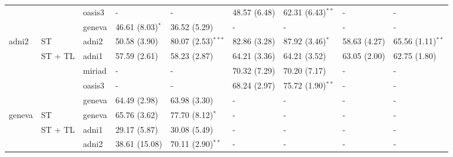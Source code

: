 \begin{table*}
{\begin{tabular}{lllllllll}
       &                 & oasis3         &              -       &             -          &   48.57 (6.48) &   62.31 (6.43)$^{**}$ &             - &             -         \\
       &                 & geneva         &   46.61 (8.03)$^{*}$ &  36.52 (5.29)          &              - &              -        &             - &             -         \\
\toprule
adni2  &         ST      & adni2          &   50.58 (3.90)       &  80.07 (2.53)$^{***}$  &   82.86 (3.28) &   87.92 (3.46)$^{*}$  &  58.63 (4.27) &  65.56 (1.11)$^{**}$  \\
\cmidrule(lr){2-9}
       &         ST + TL & adni1          &   57.59 (2.61)       &  58.23 (2.87)          &   64.21 (3.36) &   64.21 (3.52)        &  63.05 (2.00) &  62.75 (1.80)         \\
       &                 & miriad         &              -       &             -          &   70.32 (7.29) &   70.20 (7.17)        &             - &             -         \\
       &                 & oasis3         &              -       &             -          &   68.24 (2.97) &   75.72 (1.90)$^{**}$ &             - &             -         \\
       &                 & geneva         &   64.49 (2.98)       &  63.98 (3.30)          &              - &              -        &             - &             -         \\
\toprule
geneva &         ST      & geneva         &   65.76 (3.62)       &  77.70 (8.12)$^{*}$    &              - &              -        &             - &             -         \\
\cmidrule(lr){2-9}
       &         ST + TL & adni1          &   29.17 (5.87)       &  30.08 (5.49)          &              - &              -        &             - &             -         \\
       &                 & adni2          &  38.61 (15.08)       &  70.11 (2.90)$^{**}$   &              - &              -        &             - &             -         \\

\end{tabular}}
\end{table*}
